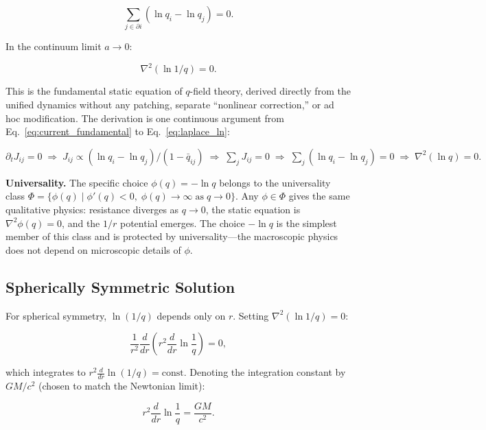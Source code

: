 \documentclass[aps,prd,twocolumn,showpacs,superscriptaddress,preprintnumbers]{revtex4-2}
\begin{document}
\begin{equation}
\sum_{j \in \partial i} (\ln q_i - \ln q_j) = 0.
\label{eq:laplace_ln_disc}
\end{equation}

In the continuum limit $a\to0$:

\begin{equation}
\boxed{\nabla^2(\ln 1/q) = 0}.
\label{eq:laplace_ln}
\end{equation}

This is the fundamental static equation of $q$-field theory, derived directly from the unified dynamics without any patching, separate ``nonlinear correction,'' or ad hoc modification.
The derivation is one continuous argument from Eq.~\eqref{eq:current_fundamental} to Eq.~\eqref{eq:laplace_ln}:

\begin{center}
\small
$\partial_t J_{ij}=0 \;\Rightarrow\; J_{ij} \propto (\ln q_i-\ln q_j)/(1-\bar{q}_{ij}) \;\Rightarrow\; \sum_j J_{ij}=0 \;\Rightarrow\; \sum_j(\ln q_i-\ln q_j)=0 \;\Rightarrow\; \nabla^2(\ln q)=0.$
\end{center}

\textbf{Universality.}
The specific choice $\phi(q)=-\ln q$ belongs to the universality class $\Phi=\{\phi(q) \mid \phi'(q)<0,\;\phi(q)\to\infty\;\text{as}\;q\to0\}$.
Any $\phi\in\Phi$ gives the same qualitative physics: resistance diverges as $q\to0$, the static equation is $\nabla^2\phi(q)=0$, and the $1/r$ potential emerges.
The choice $-\ln q$ is the simplest member of this class and is protected by universality---the macroscopic physics does not depend on microscopic details of $\phi$.

\subsection{Spherically Symmetric Solution}

For spherical symmetry, $\ln(1/q)$ depends only on $r$.
Setting $\nabla^2(\ln 1/q)=0$:

\begin{equation}
\frac{1}{r^2}\frac{d}{dr}\left(r^2 \frac{d}{dr}\ln\frac{1}{q}\right) = 0,
\label{eq:ode}
\end{equation}

which integrates to $r^2\frac{d}{dr}\ln(1/q)=\text{const}$.
Denoting the integration constant by $GM/c^2$ (chosen to match the Newtonian limit):

\begin{equation}
r^2 \frac{d}{dr}\ln\frac{1}{q} = \frac{GM}{c^2}.
\label{eq:first_int}
\end{equation}
\end{document}
